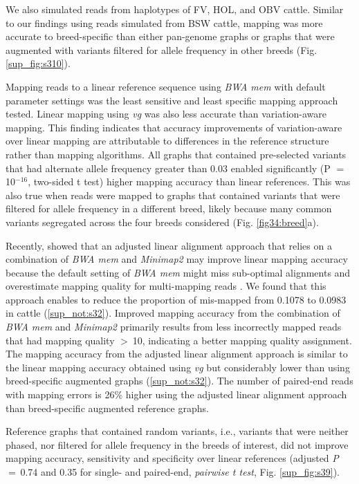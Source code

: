 \documentclass[../main.tex]{subfiles}
\begin{document}
We also simulated reads from haplotypes of FV, HOL, and OBV cattle. Similar to our findings using reads simulated from BSW cattle, mapping was more accurate to breed-specific than either pan-genome graphs or graphs that were augmented with variants filtered for allele frequency in other breeds (Fig. \ref{sup_fig:s310}).

Mapping reads to a linear reference sequence using \emph{BWA mem} with default parameter settings was the least sensitive and least specific mapping approach tested. Linear mapping using \emph{vg} was also less accurate than variation-aware mapping. This finding indicates that accuracy improvements of variation-aware over linear mapping are attributable to differences in the reference structure rather than mapping algorithms. All graphs that contained pre-selected variants that had alternate allele frequency greater than 0.03 enabled significantly (P $=$ 10$^{−16}$, two-sided t test) higher mapping accuracy than linear references. This was also true when reads were mapped to graphs that contained variants that were filtered for allele frequency in a different breed, likely because many common variants segregated across the four breeds considered (Fig. \ref{fig34:breed}a).

Recently, \citet{grytten2020assessing} showed that an adjusted linear alignment approach that relies on a combination of \emph{BWA mem} and \emph{Minimap2} \citep{li2018minimap2} may improve linear mapping accuracy because the default setting of \emph{BWA mem} might miss sub-optimal alignments and overestimate mapping quality for multi-mapping reads \citep{grytten2020assessing,li2013aligning}. We found that this approach enables to reduce the proportion of mis-mapped from 0.1078 to 0.0983 in cattle (\ref{sup_not:s32}). Improved mapping accuracy from the combination of \emph{BWA mem} and \emph{Minimap2} primarily results from less incorrectly mapped reads that had mapping quality $>$ 10, indicating a better mapping quality assignment. The mapping accuracy from the adjusted linear alignment approach is similar to the linear mapping accuracy obtained using \emph{vg} but considerably lower than using breed-specific augmented graphs (\ref{sup_not:s32}). The number of paired-end reads with mapping errors is 26\% higher using the adjusted linear alignment approach than breed-specific augmented reference graphs.

Reference graphs that contained random variants, i.e., variants that were neither phased, nor filtered for allele frequency in the breeds of interest, did not improve mapping accuracy, sensitivity and specificity over linear references (adjusted \emph{P} $=$ 0.74 and 0.35 for single- and paired-end, \emph{pairwise t test}, Fig. \ref{sup_fig:s39}).
\end{document}
